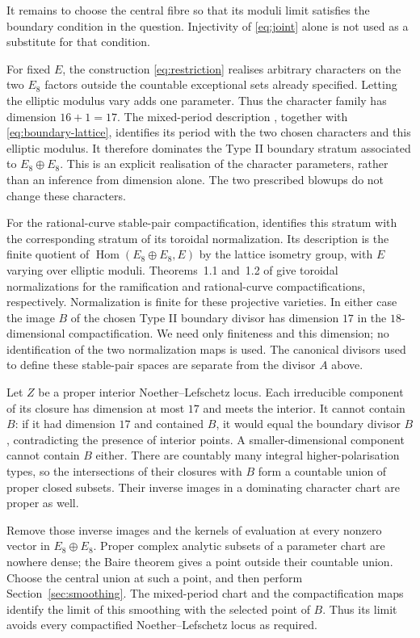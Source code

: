\documentclass[11pt]{article}
\theoremstyle{definition}
\theoremstyle{remark}
\newcommand{\Hom}{\operatorname{Hom}}
\begin{document}
It remains to choose the central fibre so that its moduli limit satisfies the boundary condition in the question. Injectivity of \eqref{eq:joint} alone is not used as a substitute for that condition.

For fixed $E$, the construction \eqref{eq:restriction} realises arbitrary characters on the two $E_8$ factors outside the countable exceptional sets already specified. Letting the elliptic modulus vary adds one parameter. Thus the character family has dimension $16+1=17$. The mixed-period description \cite[Construction~4.3 and \S7A]{AE}, together with \eqref{eq:boundary-lattice}, identifies its period with the two chosen characters and this elliptic modulus. It therefore dominates the Type II boundary stratum associated to $E_8\oplus E_8$. This is an explicit realisation of the character parameters, rather than an inference from dimension alone. The two prescribed blowups do not change these characters.

For the rational-curve stable-pair compactification, \cite[Theorem~7.58]{ABE} identifies this stratum with the corresponding stratum of its toroidal normalization. Its description is the finite quotient of $\Hom(E_8\oplus E_8,E)$ by the lattice isometry group, with $E$ varying over elliptic moduli. Theorems~1.1 and~1.2 of \cite{ABE} give toroidal normalizations for the ramification and rational-curve compactifications, respectively. Normalization is finite for these projective varieties. In either case the image $B$ of the chosen Type II boundary divisor has dimension $17$ in the $18$-dimensional compactification. We need only finiteness and this dimension; no identification of the two normalization maps is used. The canonical divisors used to define these stable-pair spaces are separate from the divisor $A$ above.

Let $Z$ be a proper interior Noether--Lefschetz locus. Each irreducible component of its closure has dimension at most $17$ and meets the interior. It cannot contain $B$: if it had dimension $17$ and contained $B$, it would equal the boundary divisor $B$, contradicting the presence of interior points. A smaller-dimensional component cannot contain $B$ either. There are countably many integral higher-polarisation types, so the intersections of their closures with $B$ form a countable union of proper closed subsets. Their inverse images in a dominating character chart are proper as well.

Remove those inverse images and the kernels of evaluation at every nonzero vector in $E_8\oplus E_8$. Proper complex analytic subsets of a parameter chart are nowhere dense; the Baire theorem gives a point outside their countable union. Choose the central union at such a point, and then perform Section~\ref{sec:smoothing}. The mixed-period chart and the compactification maps identify the limit of this smoothing with the selected point of $B$. Thus its limit avoids every compactified Noether--Lefschetz locus as required.
\end{document}
